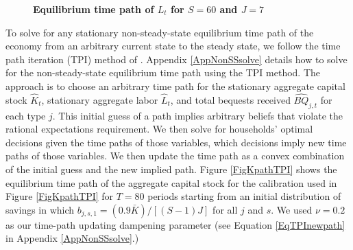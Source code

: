 \documentclass[letterpaper,12pt]{article}
\theoremstyle{definition}
\begin{document}
\begin{spacing}{1.5}
    \begin{figure}[htb]\centering \captionsetup{width=4.0in}
      \caption{\label{FigLpathTPI}\textbf{Equilibrium time path of $L_t$ for $S=60$ and $J=7$}}
    \end{figure}

    To solve for any stationary non-steady-state equilibrium time path of the economy from an arbitrary current state to the steady state, we follow the time path iteration (TPI) method of \citet{AuerbachKotlikoff:1987}. Appendix \ref{AppNonSSsolve} details how to solve for the non-steady-state equilibrium time path using the TPI method. The approach is to choose an arbitrary time path for the stationary aggregate capital stock $\hat{K}_t$, stationary aggregate labor $\hat{L}_t$, and total bequests received $\hat{BQ}_{j,t}$ for each type $j$. This initial guess of a path implies arbitrary beliefs that violate the rational expectations requirement. We then solve for households' optimal decisions given the time paths of those variables, which decisions imply new time paths of those variables. We then update the time path as a convex combination of the initial guess and the new implied path. Figure \ref{FigKpathTPI} shows the equilibrium time path of the aggregate capital stock for the calibration used in Figure \ref{FigKpathTPI} for $T=80$ periods starting from an initial distribution of savings in which $b_{j,s,1}=(0.9\bar{K})/[(S-1)J]$ for all $j$ and $s$. We used $\nu=0.2$ as our time-path updating dampening parameter (see Equation \eqref{EqTPInewpath} in Appendix \ref{AppNonSSsolve}.)


\clearpage

\end{spacing}
\end{document}
